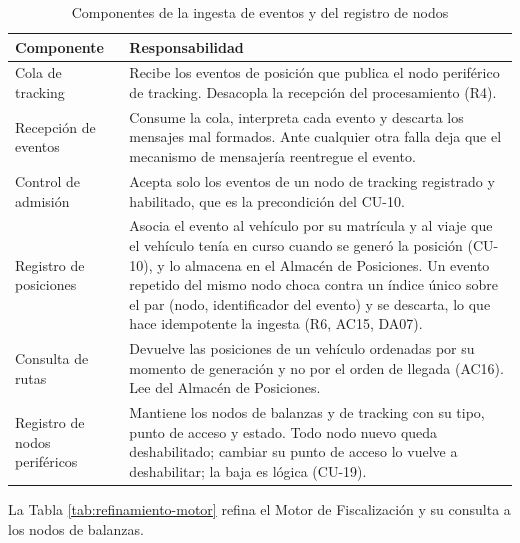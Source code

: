\begin{table}[H]
    \small
    \centering
    \caption{Componentes de la ingesta de eventos y del registro de nodos}
    \label{tab:refinamiento-ingesta}
    \begin{tabular}{|p{3.6cm}|p{12.2cm}|}
        \hline
        \textbf{Componente} & \textbf{Responsabilidad} \\
        \hline
        Cola de tracking & Recibe los eventos de posición que publica el nodo periférico de tracking. Desacopla la recepción del procesamiento (R4). \\
        \hline
        Recepción de eventos & Consume la cola, interpreta cada evento y descarta los mensajes mal formados. Ante cualquier otra falla deja que el mecanismo de mensajería reentregue el evento. \\
        \hline
        Control de admisión & Acepta solo los eventos de un nodo de tracking registrado y habilitado, que es la precondición del CU-10. \\
        \hline
        Registro de posiciones & Asocia el evento al vehículo por su matrícula y al viaje que el vehículo tenía en curso cuando se generó la posición (CU-10), y lo almacena en el Almacén de Posiciones. Un evento repetido del mismo nodo choca contra un índice único sobre el par (nodo, identificador del evento) y se descarta, lo que hace idempotente la ingesta (R6, AC15, DA07). \\
        \hline
        Consulta de rutas & Devuelve las posiciones de un vehículo ordenadas por su momento de generación y no por el orden de llegada (AC16). Lee del Almacén de Posiciones. \\
        \hline
        Registro de nodos periféricos & Mantiene los nodos de balanzas y de tracking con su tipo, punto de acceso y estado. Todo nodo nuevo queda deshabilitado; cambiar su punto de acceso lo vuelve a deshabilitar; la baja es lógica (CU-19). \\
        \hline
    \end{tabular}
\end{table}

La Tabla \ref{tab:refinamiento-motor} refina el Motor de Fiscalización y su consulta a los nodos de balanzas.


